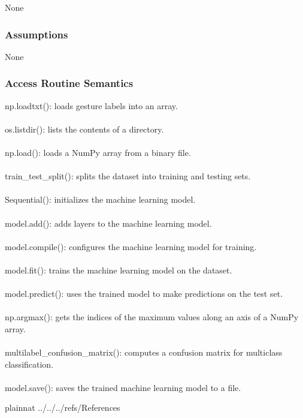 \documentclass[12pt, titlepage]{article}
\begin{document}
None\\

\subsubsection{Assumptions}

None\\

\subsubsection{Access Routine Semantics}

np.loadtxt(): loads gesture labels into an array.\\
\\
os.listdir(): lists the contents of a directory.\\
\\
np.load(): loads a NumPy array from a binary file.\\
\\
train\_test\_split(): splits the dataset into training and testing sets.\\
\\
Sequential(): initializes the machine learning model.\\
\\
model.add(): adds layers to the machine learning model.\\
\\
model.compile(): configures the machine learning model for training.\\
\\
model.fit(): trains the machine learning model on the dataset.\\
\\
model.predict(): uses the trained model to make predictions on the test set.\\
\\
np.argmax(): gets the indices of the maximum values along an axis of a NumPy array.\\
\\
multilabel\_confusion\_matrix(): computes a confusion matrix for multiclass classification.\\
\\
model.save(): saves the trained machine learning model to a file.\\

\newpage

 {plainnat}
 {../../../refs/References}
\end{document}
